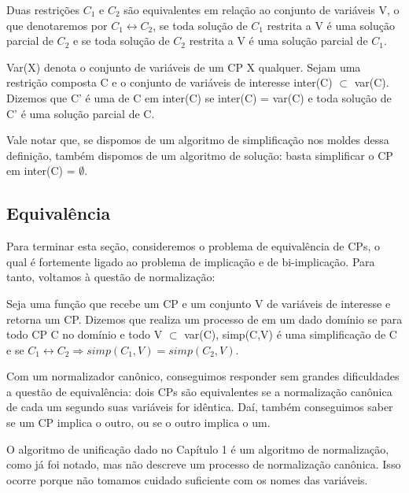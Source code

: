 \documentclass{article}
\begin{document}
\begin{definition}
  Duas restrições  $C_1$ e $C_2$ são equivalentes em relação ao
  conjunto de variáveis V, o que denotaremos por $C_1 \leftrightarrow C_2$, se toda solução de $C_1$
  restrita a V é uma solução parcial de $C_2$ e se toda solução de $C_2$ restrita a V é uma solução parcial de $C_1$.
\end{definition}

\begin{definition}
  Var(X) denota o conjunto de variáveis de um CP X qualquer. Sejam uma restrição composta C e o conjunto de variáveis de interesse inter(C) $\subset$ var(C). Dizemos que C' é uma  de C em inter(C) se inter(C) = var(C) e toda solução de C' é uma solução parcial de C.
\end{definition}

Vale notar que, se dispomos de um algoritmo de simplificação nos moldes dessa definição, também dispomos de um algoritmo de solução: basta simplificar o CP em inter(C) = $\emptyset$.

\subsection{Equivalência}

  Para terminar esta seção, consideremos o problema de equivalência de CPs, o qual é fortemente ligado ao problema de implicação e de bi-implicação. Para tanto, voltamos à questão de normalização:

\begin{definition}
    Seja  uma função que recebe um CP e um conjunto V de variáveis de interesse e retorna um CP. Dizemos que  realiza um processo de  em um dado domínio se para todo CP C no domínio e todo V $\subset$ var(C), simp(C,V) é uma simplificação de C e se $C_1 \leftrightarrow C_2 \Rightarrow simp(C_1,V) = simp(C_2,V)$.
\end{definition}

  Com um normalizador canônico, conseguimos responder sem grandes dificuldades a questão de equivalência: dois CPs são equivalentes se a normalização canônica de cada um segundo suas variáveis for idêntica. Daí, também conseguimos saber se um CP implica o outro, ou se o outro implica o um.

  O algoritmo de unificação dado no Capítulo 1 %
é um algoritmo de normalização, como já foi notado, mas não descreve um processo de normalização canônica. Isso ocorre porque não tomamos cuidado suficiente com os nomes das variáveis.
\end{document}

